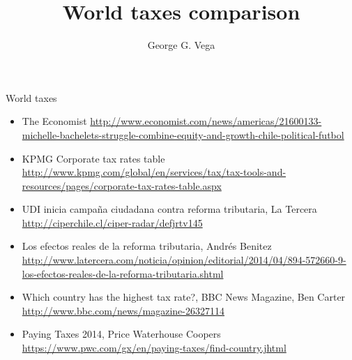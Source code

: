 \documentclass{article}
\title{World taxes comparison}
\author{George G. Vega}
\begin{document}
\maketitle

World taxes

\begin{itemize}
\item The Economist \url{http://www.economist.com/news/americas/21600133-michelle-bachelets-struggle-combine-equity-and-growth-chile-political-futbol}
\item KPMG Corporate tax rates table \url{http://www.kpmg.com/global/en/services/tax/tax-tools-and-resources/pages/corporate-tax-rates-table.aspx}
\item UDI inicia campa\~na ciudadana contra reforma tributaria, La Tercera \url{http://ciperchile.cl/ciper-radar/defjrtv145}
\item Los efectos reales de la reforma tributaria, Andr\'es Benitez \url{http://www.latercera.com/noticia/opinion/editorial/2014/04/894-572660-9-los-efectos-reales-de-la-reforma-tributaria.shtml}
\item Which country has the highest tax rate?, BBC News Magazine, Ben Carter \url{http://www.bbc.com/news/magazine-26327114}
\item Paying Taxes 2014, Price Waterhouse Coopers \url{https://www.pwc.com/gx/en/paying-taxes/find-country.jhtml}
\end{itemize}
\end{document}
